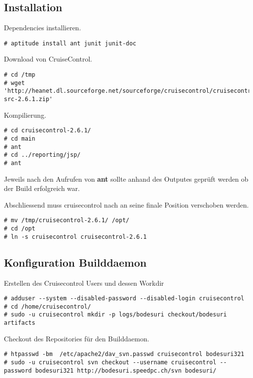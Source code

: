\documentclass[a4paper,12pt,halfparskip,DIV14]{scrreprt}
\begin{document}
\subsection{Installation} %
\label{sub:installation-cruisecontrol}


Dependencies installieren.

\begin{verbatim}
# aptitude install ant junit junit-doc
\end{verbatim}

Download von CruiseControl.

\begin{verbatim}
# cd /tmp
# wget 'http://heanet.dl.sourceforge.net/sourceforge/cruisecontrol/cruisecontrol-src-2.6.1.zip'
\end{verbatim}

Kompilierung.

\begin{verbatim}
# cd cruisecontrol-2.6.1/
# cd main
# ant
# cd ../reporting/jsp/
# ant
\end{verbatim}

Jeweils nach den Aufrufen von \textbf{ant} sollte anhand des Outputes geprüft werden ob der Build erfolgreich war.

Abschliessend muss cruisecontrol nach an seine finale Position verschoben werden.

\begin{verbatim}
# mv /tmp/cruisecontrol-2.6.1/ /opt/
# cd /opt
# ln -s cruisecontrol cruisecontrol-2.6.1
\end{verbatim}



\subsection{Konfiguration Builddaemon} %
\label{sub:konfiguration_builddaemon}

Erstellen des Cruisecontrol Users und dessen Workdir

\begin{verbatim}
# adduser --system --disabled-password --disabled-login cruisecontrol
# cd /home/cruisecontrol/
# sudo -u cruisecontrol mkdir -p logs/bodesuri checkout/bodesuri artifacts
\end{verbatim}

Checkout des Repositories für den Builddaemon. 

\begin{verbatim}
# htpasswd -bm  /etc/apache2/dav_svn.passwd cruisecontrol bodesuri321
# sudo -u cruisecontrol svn checkout --username cruisecontrol --password bodesuri321 http://bodesuri.speedpc.ch/svn bodesuri/
\end{verbatim}
\end{document}
